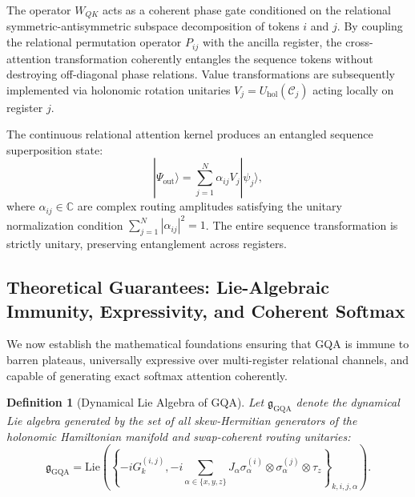 \documentclass{article}
\newtheorem{definition}{Definition}
\begin{document}
The operator $W_{QK}$ acts as a coherent phase gate conditioned on the relational symmetric-antisymmetric subspace decomposition of tokens $i$ and $j$. By coupling the relational permutation operator $P_{ij}$ with the ancilla register, the cross-attention transformation coherently entangles the sequence tokens without destroying off-diagonal phase relations. Value transformations are subsequently implemented via holonomic rotation unitaries $V_j = U_{\mathrm{hol}}(\mathcal{C}_j)$ acting locally on register $j$.

The continuous relational attention kernel produces an entangled sequence superposition state:
\begin{equation}
|\Psi_{\mathrm{out}}\rangle = \sum_{j=1}^N \alpha_{ij} V_j |\psi_j\rangle,
\label{eq:output_state}
\end{equation}
where $\alpha_{ij} \in \mathbb{C}$ are complex routing amplitudes satisfying the unitary normalization condition $\sum_{j=1}^N |\alpha_{ij}|^2 = 1$. The entire sequence transformation is strictly unitary, preserving entanglement across registers.

\subsection{Theoretical Guarantees: Lie-Algebraic Immunity, Expressivity, and Coherent Softmax}
\label{sec:theoretical_guarantees}

We now establish the mathematical foundations ensuring that GQA is immune to barren plateaus, universally expressive over multi-register relational channels, and capable of generating exact softmax attention coherently.

\begin{definition}[Dynamical Lie Algebra of GQA]
Let $\mathfrak{g}_{\mathrm{GQA}}$ denote the dynamical Lie algebra generated by the set of all skew-Hermitian generators of the holonomic Hamiltonian manifold and swap-coherent routing unitaries:
\begin{equation}
\mathfrak{g}_{\mathrm{GQA}} = \mathrm{Lie}\left( \left\{ -i G_k^{(i, j)}, -i \sum_{\alpha \in \{x, y, z\}} J_\alpha \sigma_\alpha^{(i)} \otimes \sigma_\alpha^{(j)} \otimes \tau_z \right\}_{k, i, j, \alpha} \right).
\label{eq:dla_definition}
\end{equation}
\end{definition}
\end{document}
